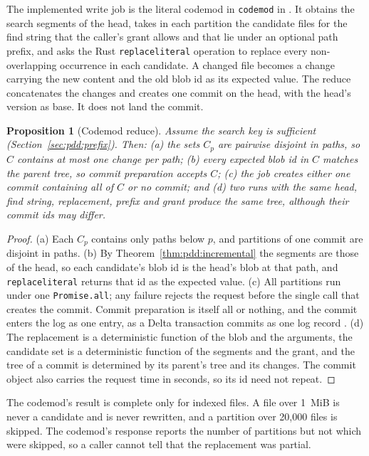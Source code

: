 \documentclass[11pt,letterpaper]{article}
\newtheorem{proposition}[theorem]{Proposition}
\theoremstyle{definition}
\theoremstyle{remark}
\DeclareRobustCommand{\code}[1]{{\def\_{\textunderscore\allowbreak}\texttt{#1}}}
\begin{document}
The implemented write job is the literal codemod in \code{codemod} in . It obtains the search segments of the head, takes in each partition the candidate files for the find string that the caller's grant allows and that lie under an optional path prefix, and asks the Rust \code{replace\_literal} operation to replace every non-overlapping occurrence in each candidate. A changed file becomes a change carrying the new content and the old blob id as its expected value. The reduce concatenates the changes and creates one commit on the head, with the head's version as base. It does not land the commit.

\begin{proposition}[Codemod reduce]
\label{prop:pdd:codemod}
Assume the search key is sufficient (Section~\ref{sec:pdd:prefix}). Then: (a) the sets $C_p$ are pairwise disjoint in paths, so $C$ contains at most one change per path; (b) every expected blob id in $C$ matches the parent tree, so commit preparation accepts $C$; (c) the job creates either one commit containing all of $C$ or no commit; and (d) two runs with the same head, find string, replacement, prefix and grant produce the same tree, although their commit ids may differ.
\end{proposition}

\begin{proof}
(a) Each $C_p$ contains only paths below $p$, and partitions of one commit are disjoint in paths. (b) By Theorem~\ref{thm:pdd:incremental} the segments are those of the head, so each candidate's blob id is the head's blob at that path, and \code{replace\_literal} returns that id as the expected value. (c) All partitions run under one \code{Promise.all}; any failure rejects the request before the single call that creates the commit. Commit preparation is itself all or nothing, and the commit enters the log as one entry, as a Delta transaction commits as one log record \cite{armbrust2020delta}. (d) The replacement is a deterministic function of the blob and the arguments, the candidate set is a deterministic function of the segments and the grant, and the tree of a commit is determined by its parent's tree and its changes. The commit object also carries the request time in seconds, so its id need not repeat.
\end{proof}

The codemod's result is complete only for indexed files. A file over 1~MiB is never a candidate and is never rewritten, and a partition over 20,000 files is skipped. The codemod's response reports the number of partitions but not which were skipped, so a caller cannot tell that the replacement was partial.
\end{document}
